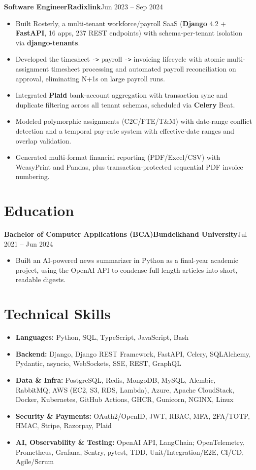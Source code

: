 \documentclass[11pt,a4paper]{article}
\newcommand{\entry}[3]{%
  \vspace{4.5pt}\noindent\textbf{#1}\hfill\textbf{#2}\hfill{\color{subtlegray}#3}\par\vspace{2pt}}
\begin{document}
\entry{Software Engineer}{Radixlink}{Jun 2023 -- Sep 2024}
\begin{itemize}
  \item Built Rosterly, a multi-tenant workforce/payroll SaaS (\textbf{Django} 4.2
        + \textbf{FastAPI}, 16 apps, 237 REST endpoints) with schema-per-tenant
        isolation via \textbf{django-tenants}.
  \item Developed the timesheet \texttt{->} payroll \texttt{->} invoicing
        lifecycle with atomic multi-assignment timesheet processing and automated
        payroll reconciliation on approval, eliminating N+1s on large payroll runs.
  \item Integrated \textbf{Plaid} bank-account aggregation with transaction sync
        and duplicate filtering across all tenant schemas, scheduled via
        \textbf{Celery} Beat.
  \item Modeled polymorphic assignments (C2C/FTE/T\&M) with date-range conflict
        detection and a temporal pay-rate system with effective-date ranges and
        overlap validation.
  \item Generated multi-format financial reporting (PDF/Excel/CSV) with WeasyPrint
        and Pandas, plus transaction-protected sequential PDF invoice numbering.
\end{itemize}

\section{Education}
\entry{Bachelor of Computer Applications (BCA)}{Bundelkhand University}{Jul 2021 -- Jun 2024}
\begin{itemize}
  \item Built an AI-powered news summarizer in Python as a final-year academic
        project, using the OpenAI API to condense full-length articles into short,
        readable digests.
\end{itemize}

\section{Technical Skills}
\begin{itemize}
  \item \textbf{Languages:} Python, SQL, TypeScript, JavaScript, Bash
  \item \textbf{Backend:} Django, Django REST Framework, FastAPI, Celery,
        SQLAlchemy, Pydantic, asyncio, WebSockets, SSE, REST, GraphQL
  \item \textbf{Data \& Infra:} PostgreSQL, Redis, MongoDB, MySQL, Alembic,
        RabbitMQ; AWS (EC2, S3, RDS, Lambda), Azure, Apache CloudStack, Docker,
        Kubernetes, GitHub Actions, GHCR, Gunicorn, NGINX, Linux
  \item \textbf{Security \& Payments:} OAuth2/OpenID, JWT, RBAC, MFA, 2FA/TOTP,
        HMAC, Stripe, Razorpay, Plaid
  \item \textbf{AI, Observability \& Testing:} OpenAI API, LangChain;
        OpenTelemetry, Prometheus,
        Grafana, Sentry, pytest, TDD, Unit/Integration/E2E, CI/CD, Agile/Scrum
\end{itemize}
\end{document}
